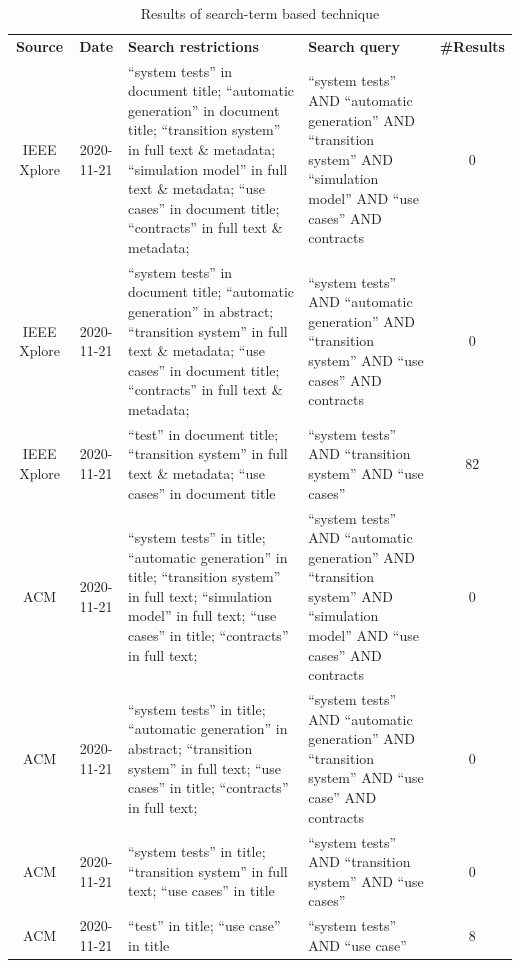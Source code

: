 \begin{longtable}[h]{c|c|p{}|p{}|c}
		\caption{Results of search-term based technique}
		\label{search-term}\setlength{\tabcolsep}{1em}\\
		\hline
		\textbf{Source} & \textbf{Date} & \textbf{Search restrictions} & \textbf{Search query} & \textbf{\#Results} \\
		\hline
		IEEE Xplore & 2020-11-21 & \enquote{system tests} in document title; \enquote{automatic generation} in document title; \enquote{transition system} in full text \& metadata; \enquote{simulation model} in full text \& metadata; \enquote{use cases} in document title; \enquote{contracts} in full text \& metadata; & \enquote{system tests} AND \enquote{automatic generation} AND \enquote{transition system} AND \enquote{simulation model} AND \enquote{use cases} AND contracts & 0 \\
		\hline
		IEEE Xplore & 2020-11-21 & \enquote{system tests} in document title; \enquote{automatic generation} in abstract; \enquote{transition system} in full text \& metadata; \enquote{use cases} in document title; \enquote{contracts} in full text \& metadata; & \enquote{system tests} AND \enquote{automatic generation} AND \enquote{transition system} AND \enquote{use cases} AND contracts & 0 \\
		\hline
		IEEE Xplore & 2020-11-21 & \enquote{test} in document title; \enquote{transition system} in full text \& metadata; \enquote{use cases} in document title & \enquote{system tests} AND \enquote{transition system} AND \enquote{use cases} & 82 \\
		\hline
		ACM & 2020-11-21 & \enquote{system tests} in title; \enquote{automatic generation} in title; \enquote{transition system} in full text; \enquote{simulation model} in full text; \enquote{use cases} in title; \enquote{contracts} in full text; & \enquote{system tests} AND \enquote{automatic generation} AND \enquote{transition system} AND \enquote{simulation model} AND \enquote{use cases} AND contracts & 0 \\
		\hline
		ACM & 2020-11-21 & \enquote{system tests} in title; \enquote{automatic generation} in abstract; \enquote{transition system} in full text; \enquote{use cases} in title; \enquote{contracts} in full text; & \enquote{system tests} AND \enquote{automatic generation} AND \enquote{transition system} AND \enquote{use case} AND contracts & 0 \\
		\hline
		ACM & 2020-11-21 & \enquote{system tests} in title; \enquote{transition system} in full text; \enquote{use cases} in title & \enquote{system tests} AND \enquote{transition system} AND \enquote{use cases} & 0 \\
		\hline
		ACM & 2020-11-21 & \enquote{test} in title; \enquote{use case} in title & \enquote{system tests} AND \enquote{use case} & 8 \\
		\hline
\end{longtable}

